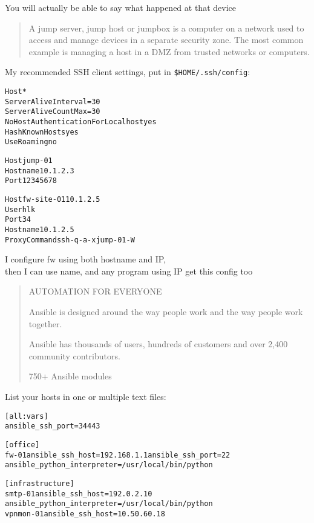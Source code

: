 \documentclass[Screen16to9,17pt]{foils}
\begin{document}
\centerline{You will actually be able to say what happened at that device}




\begin{quote}
A jump server, jump host or jumpbox is a computer on a network used to access and manage devices in a separate security zone. The most common example is managing a host in a DMZ from trusted networks or computers.
\end{quote}




My recommended SSH client settings, put in \verb+$HOME/.ssh/config+:
\begin{alltt}\footnotesize
Host *
    ServerAliveInterval=30
    ServerAliveCountMax=30
    NoHostAuthenticationForLocalhost yes
    HashKnownHosts yes
    UseRoaming no

Host jump-01
  Hostname 10.1.2.3
  Port 12345678

Host fw-site-01 10.1.2.5
  User hlk
  Port 34
  Hostname 10.1.2.5
  ProxyCommand ssh -q -a -x jump-01 -W %h:%p
\end{alltt}

I configure fw using both hostname and IP,\\
then I can use name, and any program using IP get this config too




\begin{quote}\small
AUTOMATION FOR EVERYONE

Ansible is designed around the way people work and the way people work together.

Ansible has thousands of users, hundreds of customers and over 2,400 community contributors.

750+ Ansible modules
\end{quote}



List your hosts in one or multiple text files:
\begin{alltt}\footnotesize
[all:vars]
ansible_ssh_port=34443

[office]
fw-01 ansible_ssh_host=192.168.1.1 ansible_ssh_port=22
ansible_python_interpreter=/usr/local/bin/python

[infrastructure]
smtp-01     ansible_ssh_host=192.0.2.10
ansible_python_interpreter=/usr/local/bin/python
vpnmon-01   ansible_ssh_host=10.50.60.18

\end{alltt}
\end{document}
